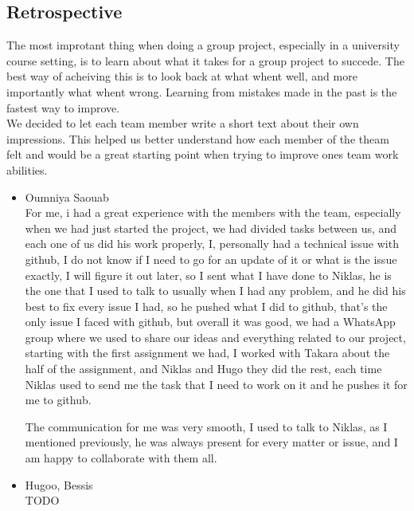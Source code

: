 \documentclass[10pt]{article}
\begin{document}
\begin{multicols*}{2}
\clearpage 

\section{Retrospective}


The most improtant thing when doing a group project, especially in a university course setting, is to learn about what it takes for a group project to succede.
The best way of acheiving this is to look back at what whent well, and more importantly what whent wrong. Learning from mistakes made in the past is the fastest way to improve.\\

We decided to let each team member write a short text about their own impressions. This helped us better understand how each member of the theam felt and would be a great starting point when trying to improve ones team work abilities.

\begin{itemize}
  \item {Oumniya Saouab}\\
  For me, i had a great experience with the members with the team, especially when we had just started the project, we had divided tasks between us, and each one of us did his work properly, I, personally had a technical issue with github, I do not know if I need to go for an update of it or what is the issue exactly, I will figure it out later, so I sent what I have done to Niklas, he is the one that I used to talk to usually when I had any problem, and he did his best to fix every issue I had, so he pushed what I did to github, that’s the only issue I faced with github, but overall it was good, we had a WhatsApp group where we used to share our ideas and everything related to our project, starting with the first assignment we had, I worked with Takara about the half of the assignment, and Niklas and Hugo they did the rest, each time Niklas used to send me the task that I need to work on it and he pushes it for me to github. 
  
  The communication for me was very smooth, I used to talk to Niklas, as I mentioned previously, he was always present for every matter or issue, and I am happy to collaborate with them all. 

  \item {Hugoo, Bessis}\\
  TODO
  

\end{itemize}
\end{multicols*}
\end{document}

